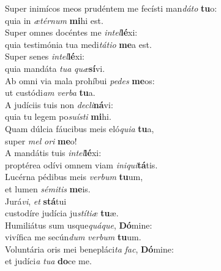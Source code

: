 \evenverse Super inimícos meos prudéntem me fecísti man\textit{dá}\textit{to} \textbf{tu}o:~\*\\
\evenverse quia in \textit{æ}\textit{tér}\textit{num} \textbf{mi}hi est.\\
\oddverse Super omnes docéntes me \textit{in}\textit{tel}\textbf{lé}xi:~\*\\
\oddverse quia testimónia tua medi\textit{tá}\textit{ti}\textit{o} \textbf{me}a est.\\
\evenverse Super senes \textit{in}\textit{tel}\textbf{lé}xi:~\*\\
\evenverse quia mandáta \textit{tu}\textit{a} \textit{quæ}\textbf{sí}vi.\\
\oddverse Ab omni via mala prohíbui \textit{pe}\textit{des} \textbf{me}os:~\*\\
\oddverse ut custódi\textit{am} \textit{ver}\textit{ba} \textbf{tu}a.\\
\evenverse A judíciis tuis non \textit{de}\textit{cli}\textbf{ná}vi:~\*\\
\evenverse quia tu legem po\textit{su}\textit{í}\textit{sti} \textbf{mi}hi.\\
\oddverse Quam dúlcia fáucibus meis eló\textit{qui}\textit{a} \textbf{tu}a,~\*\\
\oddverse super \textit{mel} \textit{o}\textit{ri} \textbf{me}o!\\
\evenverse A mandátis tuis \textit{in}\textit{tel}\textbf{lé}xi:~\*\\
\evenverse proptérea odívi omnem viam \textit{i}\textit{ni}\textit{qui}\textbf{tá}tis.\\
\oddverse Lucérna pédibus meis \textit{ver}\textit{bum} \textbf{tu}um,~\*\\
\oddverse et lumen \textit{sé}\textit{mi}\textit{tis} \textbf{me}is.\\
\evenverse Jurá\textit{vi}, \textit{et} \textbf{stá}tui~\*\\
\evenverse custodíre judícia ju\textit{stí}\textit{ti}\textit{æ} \textbf{tu}æ.\\
\oddverse Humiliátus sum usque\textit{quá}\textit{que}, \textbf{Dó}mine:~\*\\
\oddverse vivífica me secún\textit{dum} \textit{ver}\textit{bum} \textbf{tu}um.\\
\evenverse Voluntária oris mei benepláci\textit{ta} \textit{fac}, \textbf{Dó}mine:~\*\\
\evenverse et judíci\textit{a} \textit{tu}\textit{a} \textbf{do}ce me.\\

